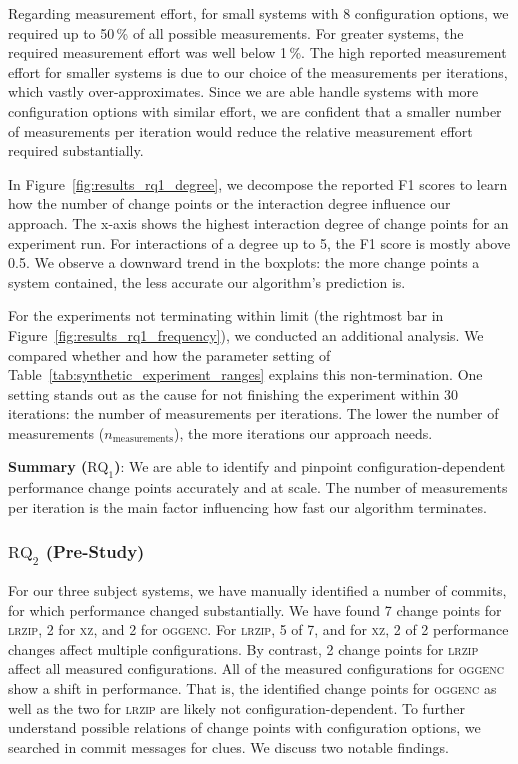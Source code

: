 \documentclass[sigconf, screen]{acmart}
\newcommand{\greybox}[1]{
	\begin{mdframed}[backgroundcolor=black!10!white,linewidth=0pt,backgroundcolor=indigo2!10,linewidth=0pt,innerleftmargin=5pt,innertopmargin=5pt]
		#1
	\end{mdframed}
}
\begin{document}
	Regarding measurement effort, for small systems with 8 configuration options, we required up to 50\,\% of all possible measurements. For greater systems, the required measurement effort was well below 1\,\%. The high reported measurement effort for smaller systems is due to our choice of the measurements per iterations, which vastly over-approximates. Since we are able handle systems with more configuration options with similar effort, we are confident that a smaller number of measurements per iteration would reduce the relative measurement effort required substantially.
	
	In Figure~\ref{fig:results_rq1_degree}, we decompose the reported F1 scores to learn how the number of change points or the interaction degree influence our approach. The x-axis shows the highest interaction degree of change points for an experiment run. For interactions of a degree up to 5, the F1 score is mostly above 0.5. We observe a downward trend in the boxplots: the more change points a system contained, the less accurate our algorithm's prediction is.
	
	For the experiments not terminating within limit (the rightmost bar in Figure~\ref{fig:results_rq1_frequency}), we conducted an additional analysis. We compared whether and how the parameter setting of Table~\ref{tab:synthetic_experiment_ranges} explains this non-termination. One setting stands out as the cause for not finishing the experiment within 30 iterations: the number of measurements per iterations. The lower the number of measurements ($n_\text{measurements}$), the more iterations our approach needs.
	\vspace{2mm}
	\greybox{
		\textbf{Summary ($\text{RQ}_1$)}: We are able to identify and pinpoint config\-uration-dependent performance change points accurately and at scale. The number of measurements per iteration is the main factor influencing how fast our algorithm terminates.
	}
	
	\subsubsection{$\text{RQ}_2$ (Pre-Study)}
	For our three subject systems, we have manually identified a number of commits, for which performance chang\-ed substantially. We have found 7 change points for \textsc{lrzip}, 2 for \textsc{xz}, and 2 for \textsc{oggenc}. For \textsc{lrzip}, 5 of 7, and for \textsc{xz}, 2 of 2 performance changes affect multiple configurations. By contrast, 2 change points for \textsc{lrzip} affect all measured configurations. All of the measured configurations for \textsc{oggenc} show a shift in performance. That is, the identified change points for \textsc{oggenc} as well as the two for \textsc{lrzip} are likely not configuration-dependent. 	
	To further understand possible relations of change points with configuration options, we searched in commit messages for clues. We discuss two notable findings. 
	
\end{document}
